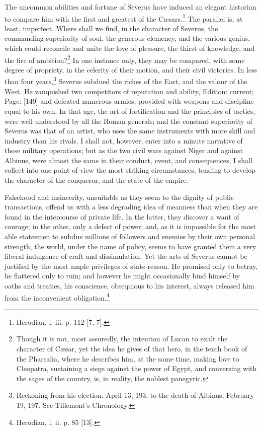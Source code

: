 The uncommon abilities and fortune of Severus have induced an elegant historian to compare him with the first and greatest of the Cæsars.\footnote{Herodian, l. iii. p. 112 [7, 7].} The parallel is, at least, imperfect. Where shall we find, in the character of Severus, the commanding superiority of soul, the generous clemency, and the various genius, which could reconcile and unite the love of pleasure, the thirst of knowledge, and the fire of ambition?\footnote{Though it is not, most assuredly, the intention of Lucan to exalt the character of Cæsar, yet the idea he gives of that hero, in the tenth book of the Pharsalia, where he describes him, at the same time, making love to Cleopatra, sustaining a siege against the power of Egypt, and conversing with the sages of the country, is, in reality, the noblest panegyric.} In one instance only, they may be compared, with some degree of propriety, in the celerity of their motion, and their civil victories. In less than four years,\footnote{Reckoning from his election, April 13, 193, to the death of Albinus, February 19, 197. See Tillemont\texthebrew{}’s Chronology.} Severus subdued the riches of the East, and the valour of the West. He vanquished two competitors of reputation and ability, Edition: current; Page: [149] and defeated numerous armies, provided with weapons and discipline equal to his own. In that age, the art of fortification and the principles of tactics, were well understood by all the Roman generals; and the constant superiority of Severus was that of an artist, who uses the same instruments with more skill and industry than his rivals. I shall not, however, enter into a minute narrative of these military operations; but as the two civil wars against Niger and against Albinus, were almost the same in their conduct, event, and consequences, I shall collect into one point of view the most striking circumstances, tending to develop the character of the conqueror, and the state of the empire.

Falsehood and insincerity, unsuitable as they seem to the dignity of public transactions, offend us with a less degrading idea of meanness than when they are found in the intercourse of private life. In the latter, they discover a want of courage; in the other, only a defect of power; and, as it is impossible for the most able statesmen to subdue millions of followers and enemies by their own personal strength, the world, under the name of policy, seems to have granted them a very liberal indulgence of craft and dissimulation. Yet the arts of Severus cannot be justified by the most ample privileges of state-reason. He promised only to betray, he flattered only to ruin; and however he might occasionally bind himself by oaths and treaties, his conscience, obsequious to his interest, always released him from the inconvenient obligation.\footnote{Herodian, l. ii. p. 85 [13].}

